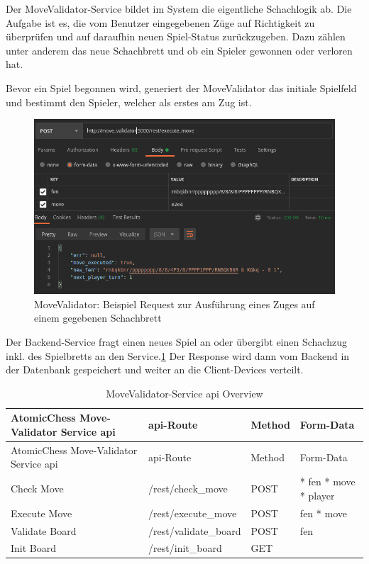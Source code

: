 Der MoveValidator-Service bildet im System die eigentliche Schachlogik
ab. Die Aufgabe ist es, die vom Benutzer eingegebenen Züge auf
Richtigkeit zu überprüfen und auf daraufhin neuen Spiel-Status
zurückzugeben. Dazu zählen unter anderem das neue Schachbrett und ob ein
Spieler gewonnen oder verloren hat.

Bevor ein Spiel begonnen wird, generiert der MoveValidator das initiale
Spielfeld und bestimmt den Spieler, welcher als erstes am Zug ist.

\begin{figure}
\centering
\includegraphics{images/ATC_movevalidator_execute_move.png}
\caption{MoveValidator: Beispiel Request zur Ausführung eines Zuges auf
einem gegebenen Schachbrett \label{ATC_movevalidator_execute_move}}
\end{figure}

Der Backend-Service fragt einen neues Spiel an oder übergibt einen
Schachzug inkl. des Spielbretts an den
Service.\ref{ATC_movevalidator_execute_move} Der Response wird dann vom
Backend in der Datenbank gespeichert und weiter an die Client-Devices
verteilt.

\begin{longtable}[]{@{}llll@{}}
\caption{MoveValidator-Service \gls{api} Overview}\tabularnewline
\toprule
AtomicChess Move-Validator Service \gls{api} & \gls{api}-Route & Method
& Form-Data\tabularnewline
\midrule
\endfirsthead
\toprule
AtomicChess Move-Validator Service \gls{api} & \gls{api}-Route & Method
& Form-Data\tabularnewline
\midrule
\endhead
Check Move & /rest/check\_move & POST & * fen * move *
player\tabularnewline
Execute Move & /rest/execute\_move & POST & fen * move\tabularnewline
Validate Board & /rest/validate\_board & POST & fen\tabularnewline
Init Board & /rest/init\_board & GET &\tabularnewline
\bottomrule
\end{longtable}

